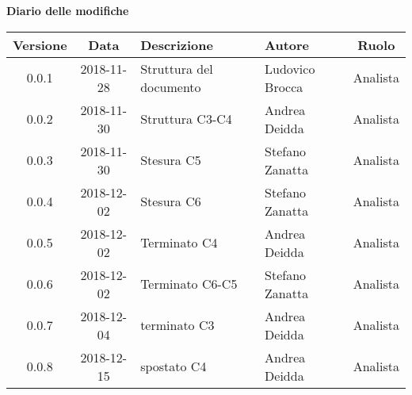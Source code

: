 \begin{center}
		\textbf{Diario delle modifiche}
	\end{center}
	\begin{center}
		\begin{tabularx}{\textwidth}{|c|c|X|X|c|}
			\hline
			\textbf{Versione} & \textbf{Data} & \textbf{Descrizione} & \textbf{Autore} & \textbf{Ruolo} \\
			\hline 
			0.0.1 &  2018-11-28& Struttura del documento & Ludovico Brocca & Analista\\
			\hline
			0.0.2 & 2018-11-30 & Struttura C3-C4 & Andrea Deidda & Analista \\
			\hline
			0.0.3 & 2018-11-30 & Stesura C5 & Stefano Zanatta & Analista \\
			\hline
			0.0.4 & 2018-12-02 & Stesura C6 & Stefano Zanatta & Analista \\
			\hline
			0.0.5 & 2018-12-02 & Terminato C4 & Andrea Deidda & Analista \\
			\hline
			0.0.6 & 2018-12-02 & Terminato C6-C5 & Stefano Zanatta & Analista \\
			\hline
			0.0.7 &  2018-12-04 & terminato C3 & Andrea Deidda & Analista \\
			\hline
			0.0.8 &  2018-12-15 & spostato C4 & Andrea Deidda & Analista \\
			\hline
		\end{tabularx}
	\end{center}
\newpage